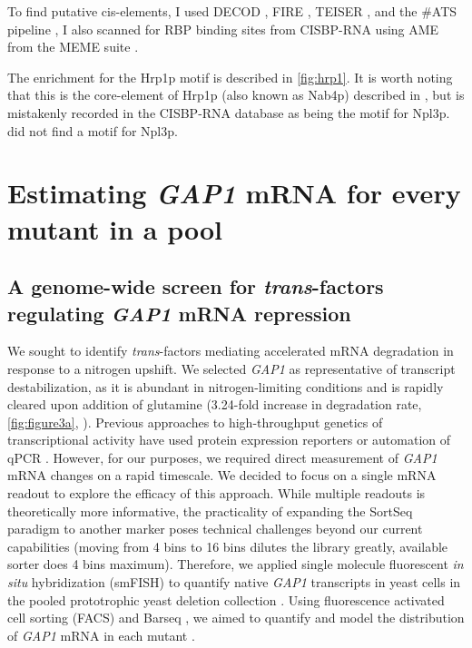 To find putative cis-elements, 
I used DECOD \parencite{huggins2011decod}, 
FIRE \parencite{elemento2007universal},
TEISER \parencite{goodarzi2012systematic},
and the \#ATS pipeline \parencite{li2010predicting},
I also scanned for RBP binding sites from
CISBP-RNA \parencite{ray2013compendium}
using AME from the MEME suite \parencite{mcleay2010motif}.

The enrichment for the Hrp1p motif is described in \autoref{fig:hrp1}.
It is worth noting that this is the core-element of Hrp1p (also known
as Nab4p) described in \cite{guisbert2005functional,chen1998specific}, 
but is mistakenly recorded in the CISBP-RNA database as being the 
motif for Npl3p. 
\cite{guisbert2005functional} did not find a motif for Npl3p.


\section{Estimating \textit{GAP1} mRNA for every mutant in a pool}

\subsection{A genome-wide screen for \textit{trans}-factors 
  regulating \textit{GAP1} mRNA repression}

We sought to identify \textit{trans}-factors mediating accelerated mRNA
degradation in response to a nitrogen upshift. We selected \textit{GAP1} 
as representative of transcript destabilization, as it is abundant in
nitrogen-limiting conditions and is rapidly cleared upon addition of
glutamine  (3.24-fold increase in degradation rate, \autoref{fig:figure3a},
). Previous approaches to high-throughput
genetics of transcriptional activity have used protein expression
reporters \parencite{neklesa2009genome,sliva2016barcode} or automation of qPCR 
\parencite{worley2016genome}. However, for our
purposes, we required direct measurement of \textit{GAP1} mRNA 
changes on a rapid timescale.
We decided to focus on a single mRNA readout to explore the efficacy
of this approach. 
While multiple readouts is theoretically more informative, the
practicality of expanding the SortSeq paradigm to another marker
poses technical challenges beyond our current capabilities
(moving from 4 bins to 16 bins dilutes the library greatly,
available sorter does 4 bins maximum).
Therefore, we applied single molecule fluorescent \textit{in situ}
hybridization (smFISH) to quantify 
native \textit{GAP1} transcripts in yeast cells in the pooled
prototrophic yeast deletion collection \parencite{vandersluis2014broad}.
Using fluorescence activated cell sorting (FACS) and Barseq
\parencite{smith2009quantitative,robinson2014design,giaever2014yeast},
we aimed to quantify and model the distribution of \textit{GAP1} mRNA
in each mutant \parencite{kinney2010using,peterman2016sort}.

